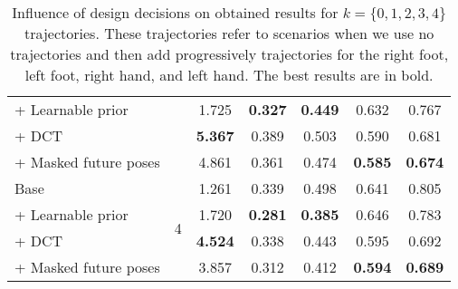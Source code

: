 \documentclass[main.tex]{subfiles}
\begin{document}
\begin{table}[htbp!]
\begin{tabular}{lcccccc}
     + Learnable prior &   &           1.725 &  \textbf{0.327} &  \textbf{0.449} &           0.632 &           0.767 \\
                 + DCT &   &  \textbf{5.367} &           0.389 &           0.503 &           0.590 &           0.681 \\
 + Masked future poses &   &           4.861 &           0.361 &           0.474 &  \textbf{0.585} &  \textbf{0.674} \\
        \midrule
                  Base &  \multirow{5}{*}{4} &           1.261 &           0.339 &           0.498 &           0.641 &           0.805 \\
     + Learnable prior &   &           1.720 &  \textbf{0.281} &  \textbf{0.385} &           0.646 &           0.783 \\
                 + DCT &   &  \textbf{4.524} &           0.338 &           0.443 &           0.595 &           0.692 \\
 + Masked future poses &   &           3.857 &           0.312 &           0.412 &  \textbf{0.594} &  \textbf{0.689} \\
    \bottomrule
    \end{tabular}
    \caption{
        Influence of design decisions on obtained results for \mbox{$k=\{0, 1,2 ,3, 4\}$} trajectories. These trajectories refer to scenarios when we use no trajectories and then add progressively trajectories for the right foot, left foot, right hand, and left hand. The best results are in bold. 
    }
    \label{tab:additional-ablation}
\end{table}
\end{document}
